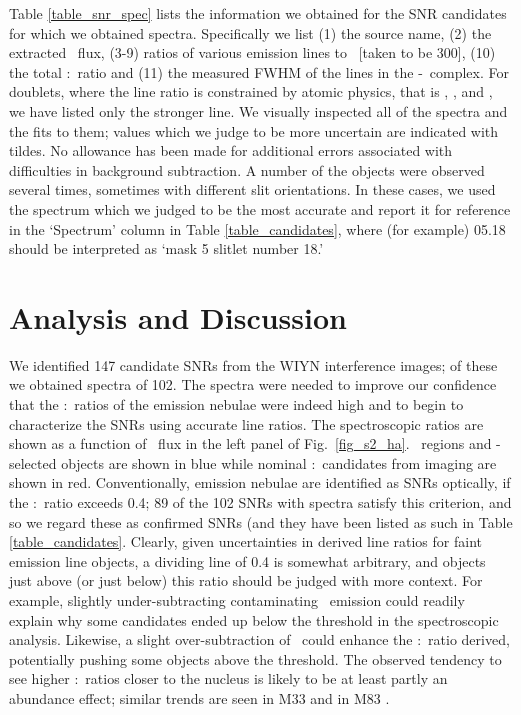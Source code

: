 Table \ref{table_snr_spec}  lists the information we obtained for the SNR candidates for which we obtained spectra.  Specifically we list (1) the source name, (2) the extracted  \ha\ flux, (3-9) ratios of various emission lines to \ha\ [taken to be 300], (10) the total \sii:\ha\ ratio and (11) the measured FWHM of the lines in the \ha-\nii\ complex.  For doublets, where the line ratio is constrained by atomic physics, that is \oiii, \oi, and \nii, we have listed only the stronger line.  We visually inspected all of the spectra and the fits to them; values which we judge to be more uncertain are indicated with tildes.  No allowance has been made for additional errors associated with difficulties in background subtraction.  A number of the objects were observed several times, sometimes with different slit orientations.  In these cases, we used the spectrum which we judged to be the most accurate and report it for reference in the `Spectrum' column in Table \ref{table_candidates}, where (for example) 05.18 should be interpreted as `mask 5 slitlet number 18.'


\section{Analysis and Discussion}

We identified 147 candidate SNRs from the WIYN interference images; of these we obtained spectra of 102. The spectra were needed to improve our confidence that the \sii:\ha\ ratios of the emission nebulae were indeed high and to begin to characterize the SNRs using accurate line ratios.  The spectroscopic ratios are shown as a function of \ha\ flux in the left panel of  Fig.\ \ref{fig_s2_ha}. \hii\ regions and \oiii-selected objects are shown in blue while nominal \sii:\ha\ candidates from imaging are shown in red.   Conventionally, emission nebulae are identified as SNRs optically, if the \sii:\ha\ ratio exceeds 0.4; 89 of the 102 SNRs with spectra satisfy this criterion, and so we regard these as confirmed SNRs (and they have been listed as such in Table \ref{table_candidates}. Clearly, given uncertainties in derived line ratios for faint emission line objects, a dividing line of 0.4 is somewhat arbitrary, and objects just above (or just below) this ratio should be judged with more context.  For example, slightly under-subtracting contaminating \ha\ emission could readily explain why some candidates ended up below the threshold in the spectroscopic analysis. Likewise, a slight over-subtraction of \ha\ could enhance the \sii:\ha\ ratio derived, potentially pushing some objects above the threshold.  The observed tendency to see higher \sii:\ha\ ratios closer to the nucleus is likely to be at least partly an abundance effect; similar trends are seen in M33 \citep{long18} and in M83 \citep{winkler17}. 

